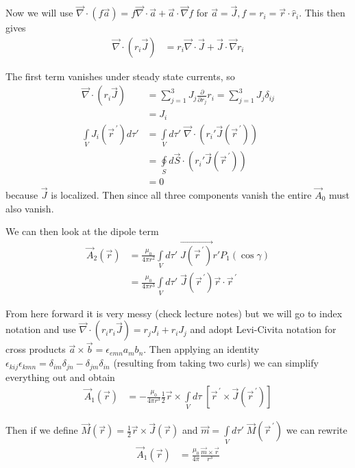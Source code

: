 \documentclass[10pt]{report}
\newcommand{\pd}[2]{\frac{\partial #1}{\partial#2}}
\newcommand{\pvec}[1]{\vec{#1}^{\,\prime}}
\begin{document}
Now we will use $\vec{\nabla}\cdot (f\vec{a}) = f\vec{\nabla}\cdot \vec{a} + \vec{a} \cdot \vec{\nabla}f$ for $\vec{a} = \vec{J}, f = r_i = \vec{r} \cdot \hat{r}_i$. This then gives
\begin{align}
    \vec{\nabla}\cdot(r_i\vec{J}) &= r_i\vec{\nabla}\cdot\vec{J} + \vec{J} \cdot \vec{\nabla}r_i
\end{align}

The first term vanishes under steady state currents, so
\begin{align}
    \vec{\nabla}\cdot (r_i\vec{J}) &= \sum_{j=1}^{3}J_j \pd{}{r_j}r_i = \sum_{j=1}^{3} J_j \delta_{ij}\\
    &= J_i\\
    \int\limits_{V}^{}J_i(\pvec{r})d\tau' &= \int\limits_{V}^{}d\tau'\;\vec{\nabla}\cdot(r_i' \vec{J}(\pvec{r}))\\
    &= \oint\limits_S d\vec{S}\cdot \left( r_i'\vec{J}(\pvec{r}) \right)\\
    &= 0
\end{align}
because $\vec{J}$ is localized. Then since all three components vanish the entire $\vec{A}_0$ must also vanish.

We can then look at the dipole term
\begin{align}
    \vec{A}_2(\vec{r}) &= \frac{\mu_0}{4\pi r^2}\int\limits_{V}^{}d\tau'\;\vec{J(\pvec{r})}r' P_1(\cos\gamma) \\
    &= \frac{\mu_0}{4\pi r^3}\int\limits_{V}^{}d\tau'\;\vec{J}(\pvec{r}) \vec{r}\cdot \pvec{r}
\end{align}

From here forward it is very messy (check lecture notes) but we will go to index notation and use $\vec{\nabla}\cdot (r_ir_i\vec{J}) = r_jJ_i + r_iJ_j$ and adopt Levi-Civita notation for cross products $\vec{a}\times \vec{b} = \epsilon_{emn}a_mb_n$. Then applying an identity $\epsilon_{kij}\epsilon_{kmn} = \delta_{im}\delta_{jn} - \delta_{jm}\delta_{in}$ (resulting from taking two curls) we can simplify everything out and obtain
\begin{align}
    \vec{A}_1(\vec{r}) &= -\frac{\mu_0}{4\pi r^3} \frac{1}{2}\vec{r}\times \int\limits_{V}^{}d\tau\;\left[ \pvec{r}\times \vec{J}(\pvec{r}) \right]
\end{align}

Then if we define $\vec{M}(\vec{r}) = \frac{1}{2}\vec{r}\times\vec{J}(\vec{r})$ and $\vec{m} = \int\limits_{V}^{}d\tau'\;\vec{M}(\pvec{r})$ we can rewrite
\begin{align}
    \vec{A}_1(\vec{r}) &= \frac{\mu_0}{4\pi}\frac{\vec{m}\times \vec{r}}{r^3}
\end{align}
\end{document}
